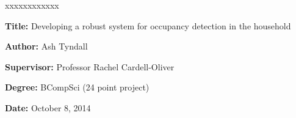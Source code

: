 \documentclass[../thesis/thesis.tex]{subfiles}
\begin{document}

\begin{namelist}{xxxxxxxxxxxx}
\item[{\bf Title:}]
	Developing a robust system for occupancy detection in the household
\item[{\bf Author:}]
	Ash Tyndall
\item[{\bf Supervisor:}]
	Professor Rachel Cardell-Oliver
\item[{\bf Degree:}]
	BCompSci (24 point project)
\item[{\bf Date:}]
	October 8, 2014
\end{namelist}
\end{document}

